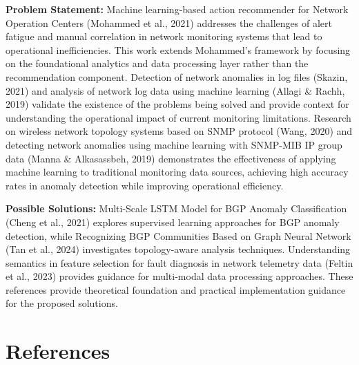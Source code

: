 \documentclass[11pt]{article}
\begin{document}
\textbf{Problem Statement:} Machine learning-based action recommender for Network Operation Centers (Mohammed et al., 2021) addresses the challenges of alert fatigue and manual correlation in network monitoring systems that lead to operational inefficiencies. This work extends Mohammed's framework by focusing on the foundational analytics and data processing layer rather than the recommendation component. Detection of network anomalies in log files (Skazin, 2021) and analysis of network log data using machine learning (Allagi \& Rachh, 2019) validate the existence of the problems being solved and provide context for understanding the operational impact of current monitoring limitations. Research on wireless network topology systems based on SNMP protocol (Wang, 2020) and detecting network anomalies using machine learning with SNMP-MIB IP group data (Manna \& Alkasassbeh, 2019) demonstrates the effectiveness of applying machine learning to traditional monitoring data sources, achieving high accuracy rates in anomaly detection while improving operational efficiency.

\textbf{Possible Solutions:} Multi-Scale LSTM Model for BGP Anomaly Classification (Cheng et al., 2021) explores supervised learning approaches for BGP anomaly detection, while Recognizing BGP Communities Based on Graph Neural Network (Tan et al., 2024) investigates topology-aware analysis techniques. Understanding semantics in feature selection for fault diagnosis in network telemetry data (Feltin et al., 2023) provides guidance for multi-modal data processing approaches. These references provide theoretical foundation and practical implementation guidance for the proposed solutions.

\section{References}
\end{document}
